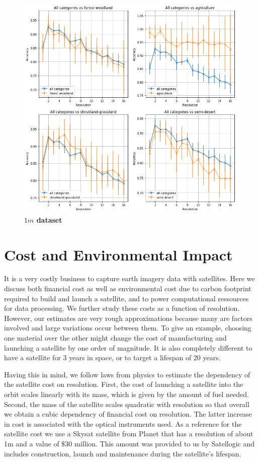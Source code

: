 \begin{figure}[h!]
	\centering
	\includegraphics[width=\textwidth]{Figures/results/results_1m_by_category.png}
	\captionsetup{width=1\linewidth}
	\caption{\textbf{$1m$ dataset}}
	\label{fig:acc_1m_byl_cat}
\end{figure}



\section{Cost and Environmental Impact}
It is a very costly business to capture earth imagery data with satellites. Here we discuss both financial cost as well as environmental cost due to carbon footprint required to build and launch a satellite, and to power computational ressources for data processing.
We further study these costs as a function of resolution. However, our estimates are very rough approximations because many are factors involved and large variations occur between them. To give an example, choosing one material over the other might change the cost of manufacturing and launching a satellite by one order of magnitude. It is also completely different to have a satellite for 3 years in space, or to target a lifespan of 20 years. 

Having this in mind, we follow laws from physics to estimate the dependency of the satellite cost on resolution. First, the cost of launching a satellite into the orbit scales linearly with its mass, which is given by the amount of fuel needed. Second, the mass of the satellite scales quadratic with resolution so that overall we obtain a cubic dependency of financial cost on resolution. The latter increase in cost is associated with the optical instruments used. As a reference for the satellite cost we use a Skysat satellite from Planet \parencite{skysat_planet} that has a resolution of about 1m and a value of $\$30$ million. This amount was provided to us by Satellogic and includes construction, launch and maintenance during the satellite's lifespan.

